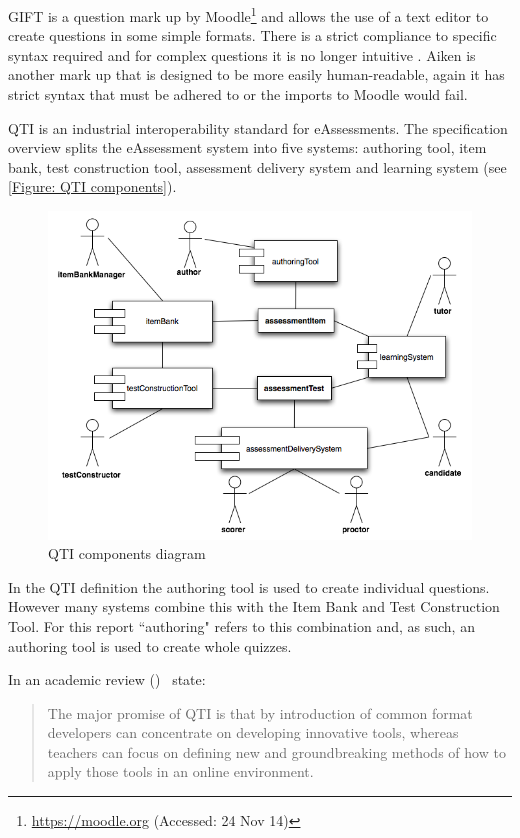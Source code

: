 GIFT is a question mark up by Moodle\footnote{\url{https://moodle.org} (Accessed: 24 Nov 14)} and allows the use of a text editor to create questions in some simple formats. There is a strict compliance to specific syntax required and for complex questions it is no longer intuitive \citep{failQTI}. Aiken is another mark up that is designed to be more easily human-readable, again it has strict syntax that must be adhered to or the imports to Moodle would fail.

\gls{QTI} is an industrial interoperability standard for \glspl{eAssessment}. The specification overview \citep{qtiOverview} splits the \gls{eAssessment} system into five systems: authoring tool, item bank, test construction tool, assessment delivery system and learning system (see \autoref{Figure: QTI components}).

\begin{figure}[h]
	\centering 
		\includegraphics[scale=0.6]{../figures/componentsQTI.png} 		
	\caption{\label{Figure: QTI components} QTI components diagram \citep{qtiOverview}} 	
\end{figure}

In the \gls{QTI} definition the authoring tool is used to create individual questions. However many systems combine this with the Item Bank and Test Construction Tool. For this report ``\gls{authoring}" refers to this combination and, as such, an authoring tool is used to create whole quizzes.

In an academic review  (\citeyear{wikieassessment})~\citep{wikieassessment} state:
\begin{quote}
The major promise of QTI is that by introduction of common format developers can concentrate on developing innovative tools, whereas teachers can focus on defining new and groundbreaking methods of how to apply those tools in an online environment.
\end{quote}

